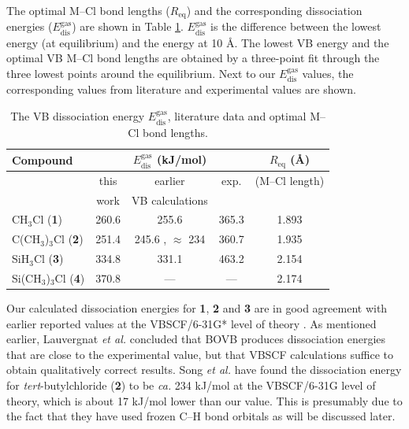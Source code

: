 The optimal M--Cl bond lengths ($R_\mathrm{eq}$) and the corresponding dissociation energies ($E_\mathrm{dis}^\mathrm{gas}$) are shown in Table \ref{ch3.tab.optimal}. $E_\mathrm{dis}^\mathrm{gas}$ is the difference between the lowest energy (at equilibrium) and the energy at 10 \AA. The lowest VB energy and the optimal VB M--Cl bond lengths are obtained by a three-point fit through the three lowest points around the equilibrium. Next to our $E_\mathrm{dis}^\mathrm{gas}$ values, the corresponding values from literature and experimental values \cite{lauvergnat,psu} are shown. 
\begin{table}[htp]
\center
\caption{The VB dissociation energy $E_\mathrm{dis}^\mathrm{gas}$, literature data \cite{lauvergnat,song,psu} and optimal M--Cl bond lengths.}
\begin{tabular}{|l|c|c|c|c|} 
\hline
Compound & \multicolumn{3}{c|}{$E_\mathrm{dis}^\mathrm{gas}$ (kJ/mol)} & $R_\mathrm{eq}$ (\AA)\\
\hline
&\multicolumn{1}{c|}{this} & \multicolumn{1}{c|}{earlier} & \multicolumn{1}{c|}{exp.} & (M--Cl length) \\
&\multicolumn{1}{c|}{work} & \multicolumn{1}{c|}{VB calculations} & \multicolumn{1}{c|}{} & \\ 
\hline
CH$_3$Cl (\textbf{1})& 260.6 & 255.6 \cite{lauvergnat} & 365.3 \cite{lauvergnat} & 1.893 \\
C(CH$_3$)$_3$Cl (\textbf{2}) & 251.4 & 245.6 \cite{psu}, $\approx$ 234 \cite{song} & 360.7 \cite{psu} & 1.935 \\
SiH$_3$Cl (\textbf{3})& 334.8 & 331.1 \cite{lauvergnat} & 463.2 \cite{lauvergnat} & 2.154 \\
Si(CH$_3$)$_3$Cl (\textbf{4}) & 370.8 & --- & --- & 2.174 \\
\hline
\end{tabular}
\label{ch3.tab.optimal}
\end{table}
Our calculated dissociation energies for \textbf{1}, \textbf{2} and \textbf{3} are in good agreement with earlier reported values at the VBSCF/6-31G* level of theory \cite{lauvergnat, psu}. As mentioned earlier, Lauvergnat \textit{et al.} \cite{lauvergnat} concluded that BOVB produces dissociation energies that are close to the experimental value, but that VBSCF calculations suffice to obtain qualitatively correct results. Song \textit{et al.} \cite{song} have found the dissociation energy for \textit{tert}-butylchloride (\textbf{2}) to be \textit{ca.} 234 kJ/mol at the VBSCF/6-31G level of theory, which is about 17 kJ/mol lower than our value. This is presumably due to the fact that they have used frozen C--H bond orbitals as will be discussed later.

